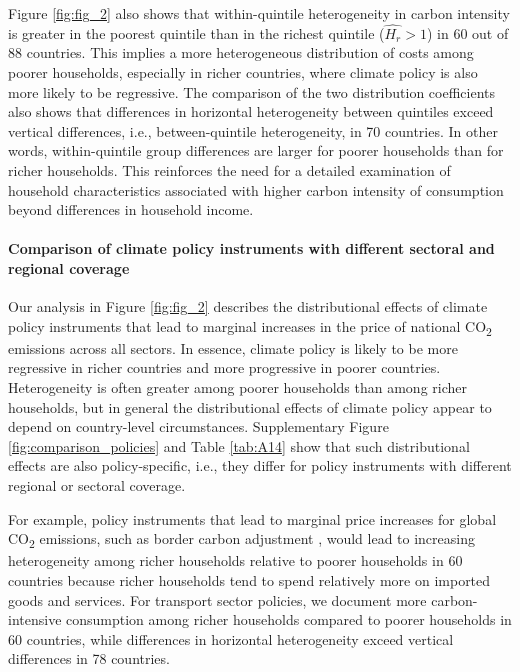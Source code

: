 \documentclass[12pt, a4paper]{article}
\begin{document}
Figure \ref{fig:fig_2} also shows that within-quintile heterogeneity in carbon intensity is greater in the poorest quintile than in the richest quintile ($\widehat{H_{r}}>1$) in 60 out of 88 countries. This implies a more heterogeneous distribution of costs among poorer households, especially in richer countries, where climate policy is also more likely to be regressive. The comparison of the two distribution coefficients also shows that differences in horizontal heterogeneity between quintiles exceed vertical differences, i.e., between-quintile heterogeneity, in 70 countries. In other words, within-quintile group differences are larger for poorer households than for richer households. This reinforces the need for a detailed examination of household characteristics associated with higher carbon intensity of consumption beyond differences in household income.

\paragraph{Comparison of climate policy instruments with different sectoral and regional coverage}

Our analysis in Figure \ref{fig:fig_2} describes the distributional effects of climate policy instruments that lead to marginal increases in the price of national CO\textsubscript{2} emissions across all sectors. In essence, climate policy is likely to be more regressive in richer countries and more progressive in poorer countries. Heterogeneity is often greater among poorer households than among richer households, but in general the distributional effects of climate policy appear to depend on country-level circumstances. Supplementary Figure \ref{fig:comparison_policies} and Table \ref{tab:A14} show that such distributional effects are also policy-specific, i.e., they differ for policy instruments with different regional or sectoral coverage.

For example, policy instruments that lead to marginal price increases for global CO\textsubscript{2} emissions, such as border carbon adjustment \autocite[e.g.,][]{Mehling.2019,Cosbey.2019}, would lead to increasing heterogeneity among richer households relative to poorer households in 60 countries because richer households tend to spend relatively more on imported goods and services. For transport sector policies, we document more carbon-intensive consumption among richer households compared to poorer households in 60 countries, while differences in horizontal heterogeneity exceed vertical differences in 78 countries. 
\end{document}
